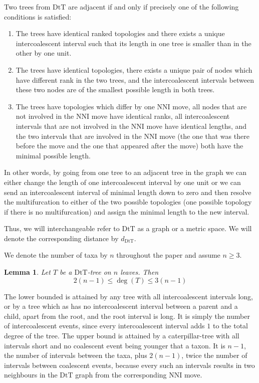 \documentclass{amsart}
\newtheorem{lemma}{Lemma}
\newcommand{\dts}{\mathrm{DtT}}
\begin{document}
Two trees from $\dts$ are adjacent if and only if precisely one of the following
conditions is satisfied: 

\begin{enumerate}[(1)]
\item The trees have identical ranked topologies and there exists a unique
intercoalescent interval such that its length in one tree is smaller than in the
other by one unit. 
\item The trees have identical topologies, there exists a unique pair of nodes
which have different rank in the two trees, and the intercoalescent intervals 
between these two nodes are of the smallest possible length in both trees. 
\item The trees have topologies which differ by one NNI move, all nodes that
are not involved in the NNI move have identical ranks, all intercoalescent
intervals that are not involved in the NNI move have identical lengths, 
and the two intervals that are involved in the NNI move (the one that was there
before the move and the one that appeared after the move) both have the minimal
possible length.  
\end{enumerate}

In other words, by going from one tree to an adjacent tree in the graph we can
either change the length of one intercoalescent interval by one unit or we
can send an intercoalescent interval of minimal length down to zero and
then resolve the multifurcation to either of the two possible topologies
(one possible topology if there is no multifurcation) and
assign the minimal length to the new interval.

Thus, we will interchangeable refer to $\dts$ as a graph or a metric space. 
We will denote the corresponding distance by $d_\dts$. 

We denote the number of taxa by $n$ throughout the paper and assume $n \geq 3$.

\begin{lemma}
Let $T$ be a $\dts$-tree on $n$ leaves. Then \[2(n-1)\leq \deg(T)\leq3(n-1)\] 
\end{lemma}

\proof
The lower bounded is attained by any tree with all intercoalescent intervals 
long, or by a tree which as has no intercoalescent interval between a parent and
a child, apart from the root, and the root interval is long. It is simply the
number of intercoalescent events, since every intercoalescent interval adds $1$
to the total degree of the tree. The upper bound is attained by a 
caterpillar-tree with all intervals short and no coalescent event being younger
that a taxon. It is $n-1$, the number of intervals between the taxa, plus 
$2(n-1)$, twice the number of intervals between coalescent events, because 
every such an intervals results in two neighbours in the $\dts$ graph from
the corresponding NNI move. 
\endproof
\end{document}
